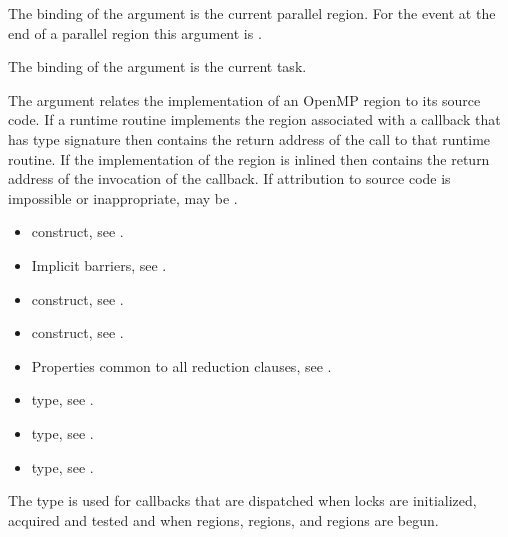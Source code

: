 The binding of the  argument is the current parallel region.
For the  event at the end of a parallel region this argument 
is .

The binding of the  argument is the current task.

The  argument relates the implementation of an OpenMP region
to its source code. If a runtime routine implements the region associated with
a callback that has type signature  then
 contains the return address of the call to that runtime routine.
If the implementation of the region is inlined then  contains the
return address of the invocation of the callback. If attribution to source code
is impossible or inappropriate, may be .

\crossreferences
\begin{itemize}
\item {} construct, see .

\item Implicit barriers, see .

\item {} construct, see .

\item {} construct, see .

\item Properties common to all reduction clauses,
see .

\item {} type, see .

\item {} type, see .

\item {} type, see .
\end{itemize}



\label{sec:ompt_callback_mutex_acquire_t}

\summary
The  type is used for callbacks that are 
dispatched when locks are initialized, acquired and tested and when  
regions,  regions, and  regions are begun.

